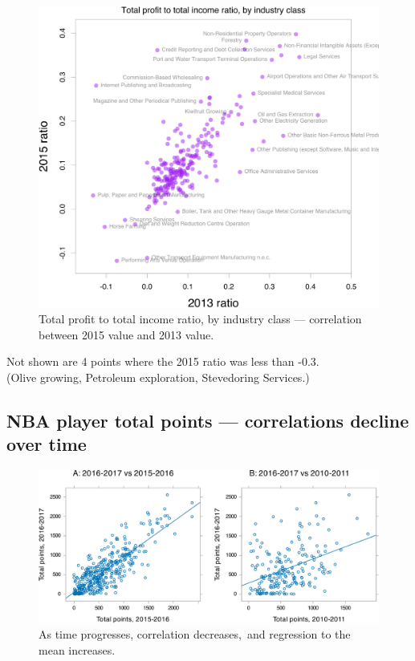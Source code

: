 \documentclass[
  10pt,
  b5paper]{book}
\begin{document}
\begin{figure}[H]

{\centering \includegraphics[width=0.9\linewidth]{07-regress_files/figure-latex/expend-1} 

}

\caption{Total profit to total income ratio, by industry class --- correlation between 2015 value and 2013 value.}\label{fig:expend}
\end{figure}

Not shown are 4 points where the 2015 ratio was less than -0.3.\\
(Olive growing, Petroleum exploration, Stevedoring Services.)

\hypertarget{nba-player-total-points-correlations-decline-over-time}{%
\subsection*{NBA player total points --- correlations decline over time}\label{nba-player-total-points-correlations-decline-over-time}}

\begin{figure}[H]

{\centering \includegraphics[width=1\linewidth]{07-regress_files/figure-latex/NBA-1} 

}

\caption{As time progresses, correlation decreases, and regression to the mean increases.}\label{fig:NBA}
\end{figure}
\end{document}
